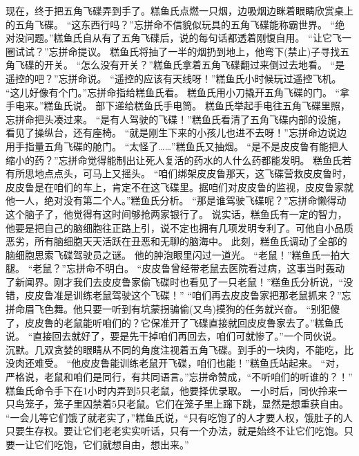 \documentclass[a4paper,12pt,UTF8,twoside]{ctexbook}
\begin{document}
        现在，终于把五角飞碟弄到手了。糕鱼氏点燃一只烟，边吸烟边眯着眼睛欣赏桌上的五角飞碟。 
        “这东西行吗？”忘拼命不信貌似玩具的五角飞碟能称霸世界。 
        “绝对没问题。”糕鱼氏自从有了五角飞碟后，说的每句话都透着刚愎自用。 
        “让它飞一圈试试？”忘拼命提议。 
        糕鱼氏将抽了一半的烟扔到地上，他弯下(禁止)子寻找五角飞碟的开关。 
        “怎么没有开关？”糕鱼氏拿着五角飞碟翻过来倒过去地看。 
      “是遥控的吧？”忘拼命说。 
      “遥控的应该有天线呀！”糕鱼氏小时候玩过遥控飞机。 
        “这儿好像有个门。”忘拼命指给糕鱼氏看。 
        糕鱼氏用小刀撬开五角飞碟的门。 
        “拿手电来。”糕鱼氏说。 
        部下递给糕鱼氏手电筒。 
        糕鱼氏举起手电往五角飞碟里照，忘拼命把头凑过来。 
        “是有人驾驶的飞碟！”糕鱼氏看清了五角飞碟内部的设施，看见了操纵台，还有座椅。 
        “就是刚生下来的小孩儿也进不去呀！”忘拼命边说边用手指量五角飞碟的舱门。 
        “太怪了……”糕鱼氏又抽烟。 
        “是不是皮皮鲁有能把人缩小的药？”忘拼命觉得能制出让死人复活的药水的人什么药都能发明。 
        糕鱼氏若有所思地点点头，可马上又摇头。 
        “咱们绑架皮皮鲁那天，这飞碟营救皮皮鲁时，皮皮鲁是在咱们的车上，肯定不在这飞碟里。据咱们对皮皮鲁的监视，皮皮鲁家就他一人，绝对没有第二个人。”糕鱼氏分析。 
        “那是谁驾驶飞碟呢？”忘拼命懒得动这个脑子了，他觉得有这时间够抢两家银行了。 
        说实话，糕鱼氏有一定的智力，他要是把自己的脑细胞往正路上引，说不定也拥有几项发明专利了。可他自小品质恶劣，所有脑细胞天天活跃在丑恶和无聊的脑海中。 
        此刻，糕鱼氏调动了全部的脑细胞思索飞碟驾驶员之谜。 
        他的肿泡眼里闪过一道光。 
        “老鼠！”糕鱼氏一拍大腿。 
        “老鼠？”忘拼命不明白。 
        “皮皮鲁曾经带老鼠去医院看过病，这事当时轰动了新闻界。刚才我们去皮皮鲁家偷飞碟时也看见了一只老鼠！”糕鱼氏分析说，“没错，皮皮鲁准是训练老鼠驾驶这个飞碟！” 
        “咱们再去皮皮鲁家把那老鼠抓来？”忘拼命眉飞色舞。他只要一听到有坑蒙拐骗偷(又鸟)摸狗的任务就兴奋。 
        “别犯傻了，皮皮鲁的老鼠能听咱们的？它保准开了飞碟直接就回皮皮鲁家去了。”糕鱼氏说。 
        “直接回去就好了，要是先干掉咱们再回去，咱们可就惨了。”一个同伙说。 
        沉默。几双贪婪的眼睛从不同的角度注视着五角飞碟。到手的一块肉，不能吃，比没肉还难受。 
        “他皮皮鲁能训练老鼠开飞碟，咱们也能！”糕鱼氏站起来。 
        “对，严格说，老鼠和咱们是同行，有共同语言。”忘拼命赞成，“不听咱们的听谁的？！” 
        糕鱼氏命令手下在1小时内弄到5只老鼠，他要择优录取。 
        一小时后，同伙拎来一只鸟笼子，笼子里囚禁着5只老鼠。它们在笼子里上蹿下跳，显然是想重获自由。 
        “一会儿等它们饿了就老实了，”糕鱼氏说，“只有吃饱了的人才要人权，饿肚子的人只要生存权。要让它们老老实实听话，只有一个办法，就是始终不让它们吃饱。只要一让它们吃饱，它们就想自由，想出来。” 
\end{document}
